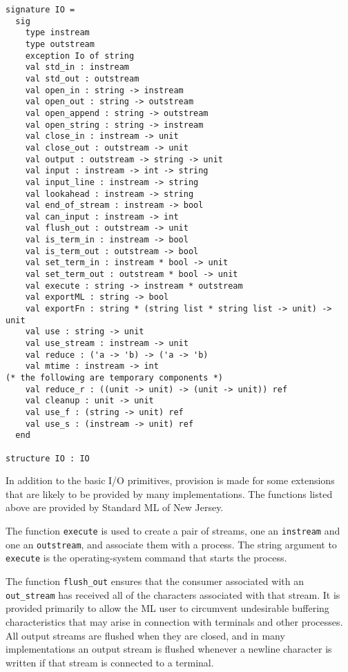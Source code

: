 \begin{verbatim}
signature IO =
  sig
    type instream 
    type outstream
    exception Io of string
    val std_in : instream
    val std_out : outstream
    val open_in : string -> instream
    val open_out : string -> outstream
    val open_append : string -> outstream
    val open_string : string -> instream
    val close_in : instream -> unit
    val close_out : outstream -> unit
    val output : outstream -> string -> unit
    val input : instream -> int -> string
    val input_line : instream -> string
    val lookahead : instream -> string
    val end_of_stream : instream -> bool
    val can_input : instream -> int
    val flush_out : outstream -> unit
    val is_term_in : instream -> bool
    val is_term_out : outstream -> bool
    val set_term_in : instream * bool -> unit
    val set_term_out : outstream * bool -> unit
    val execute : string -> instream * outstream
    val exportML : string -> bool
    val exportFn : string * (string list * string list -> unit) -> unit
    val use : string -> unit
    val use_stream : instream -> unit
    val reduce : ('a -> 'b) -> ('a -> 'b)
    val mtime : instream -> int
(* the following are temporary components *)
    val reduce_r : ((unit -> unit) -> (unit -> unit)) ref
    val cleanup : unit -> unit
    val use_f : (string -> unit) ref
    val use_s : (instream -> unit) ref
  end

structure IO : IO
\end{verbatim}

In addition to the basic I/O primitives, provision is made for some
extensions that are likely to be provided by many implementations.
The functions listed above are provided by Standard ML of New Jersey.

The function \verb"execute" is used to create a pair of streams, one an
\verb"instream" and one an \verb"outstream", and associate them with
a process.  The string argument to \verb"execute" is the
operating-system command that starts the process.

The function \verb"flush_out" ensures that the consumer associated
with an \verb"out_stream" has received all of the characters
associated with that stream.  It is provided primarily to allow the
ML user to circumvent undesirable buffering characteristics that may
arise in connection with terminals and other processes.  All output
streams are flushed when they are closed, and in many implementations
an output stream is flushed whenever a newline character is written
if that stream is connected to a terminal.

